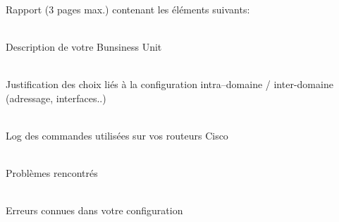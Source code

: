 \documentclass{article}
\author{Benjamain André\\Alexis Lecocp\\Arnaud Collin\\Waelkens Dimitri}
\begin{document}
\\Rapport (3 pages max.) contenant les éléments suivants:

\\Description de votre Bunsiness Unit

\\Justification des choix liés à la configuration intra--domaine / inter-domaine (adressage, interfaces..)

\\Log des commandes utilisées sur vos routeurs Cisco

\\Problèmes rencontrés

\\Erreurs connues dans votre configuration
\end{document}
